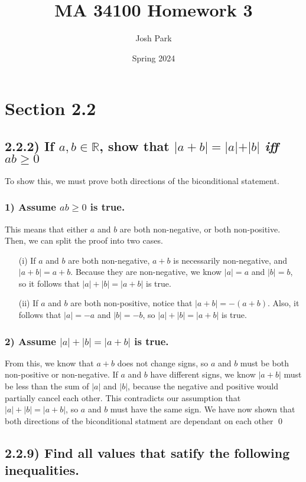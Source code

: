 \documentclass[11pt]{article}
\author{Josh Park}
\date{Spring 2024}
\title{MA 34100 Homework 3}
\newcommand{\bbR}{\mathbb{R}}    %
\begin{document}
\setlength{\parindent}{0pt}
\maketitle
\section*{Section 2.2}
\subsection*{2.2.2) If $a, b \in \bbR$, show that $\vert a+ b \vert = \vert a \vert + \vert b \vert$ \emph{iff} $ab \geq{ 0}$}
    To show this, we must prove both directions of the biconditional statement.
    \subsubsection*{1) Assume $ab \geq 0$ is true.}
    This means that either $a$ and $b$ are both non-negative, or both non-positive. Then, we can split the proof into two cases.
    \begin{enumerate}
        \item[(i)] If $a$ and $b$ are both non-negative, $a+b$ is necessarily non-negative, and $\vert a+b \vert = a+b$. Because they are non-negative, we know $|a|=a$ and $|b|=b$, so it follows that $|a|+|b| = |a+b|$ is true.

        \item[(ii)] If $a$ and $b$ are both non-positive, notice that $\vert a+b \vert = -(a+b)$. Also, it follows that $|a|=-a$ and $|b|=-b$, so $|a|+|b| = |a+b|$ is true.
    \end{enumerate}
    \subsubsection*{2) Assume $|a|+|b| = |a+b|$ is true.}
    From this, we know that $a+b$ does not change signs, so $a$ and $b$ must be both non-positive or non-negative. If $a$ and $b$ have different signs, we know $|a+b|$ must be less than the sum of $|a|$ and $|b|$, because the negative and positive would partially cancel each other. This contradicts our assumption that $|a|+|b| = |a+b|$, so $a$ and $b$ must have the same sign. We have now shown that both directions of the biconditional statment are dependant on each other \qed

\subsection*{2.2.9) Find all values that satify the following inequalities.}
\end{document}
